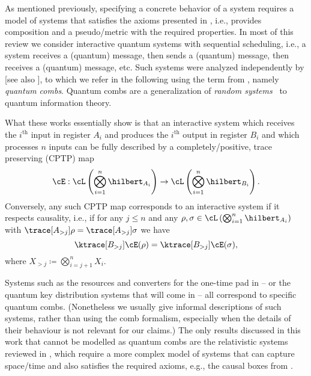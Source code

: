 As mentioned previously, specifying a concrete behavior of a system
requires a model of systems that satisfies the axioms presented in
, i.e., provides composition and a
pseudo\-/metric with the required properties. In most of this review
we consider interactive quantum systems with sequential scheduling,
i.e., a system receives a (quantum) message, then sends a (quantum)
message, then receives a (quantum) message, etc. Such systems were
analyzed independently by
\textcite{GW07,CDP09,Har11,Gut12,Har12,Har15} [see also
\textcite{Har05,Har07}], to which we refer in the following using the
term from \textcite{CDP09}, namely \emph{quantum combs}. Quantum combs
are a generalization of \emph{random systems}~\cite{Mau02,MPR07} to
quantum information theory.

What these works essentially show is that an interactive system which
receives the $i^{\text{th}}$ input in register $A_i$ and produces the
$i^{\text{th}}$ output in register $B_i$ and which processes $n$
inputs can be fully described by a completely\-/positive, trace
preserving (CPTP) map
\[ \cE : \cL\left(\bigotimes_{i = 1}^n \hilbert_{A_i}\right) \to
  \cL\left(\bigotimes_{i = 1}^n \hilbert_{B_i}\right).\] Conversely,
any such CPTP map corresponds to an interactive system if it respects
causality, i.e., if for any $j \leq n$ and any
$\rho,\sigma \in \cL\left(\bigotimes_{i = 1}^n \hilbert_{A_i}\right)$
with $\trace[A_{>j}]{\rho} = \trace[A_{>j}]{\sigma}$ we have
\[ \ktrace[B_{>j}]{\cE(\rho)} = \ktrace[B_{>j}]{\cE(\sigma)},\] where
$X_{>j} \coloneqq \bigotimes_{i = j+1}^nX_i$.

Systems such as the resources and converters for the one-time pad in
 \--- or the quantum key distribution systems that
will come in  \--- all correspond to specific quantum
combs. (Nonetheless we usually give informal descriptions of such systems,
rather than using the comb formalism, especially when the details of their behaviour is not relevant for our claims.) The only results discussed in this
work that cannot be modelled as quantum combs are the relativistic
systems reviewed in , which require a more
complex model of systems that can capture space\-/time and also
satisfies the required axioms, e.g., the causal boxes from
\textcite{PMMRT17}.

